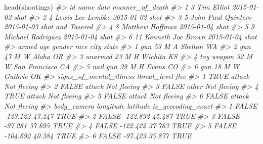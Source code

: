 \documentclass[
]{krantz}
\makeatletter
\newenvironment{Shaded}{\begin{snugshade}}{\end{snugshade}}
\newcommand{\CommentTok}[1]{\textcolor[rgb]{0.37,0.37,0.37}{\textit{#1}}}
\newcommand{\FunctionTok}[1]{\textcolor[rgb]{0,0,0}{#1}}
\newcommand{\NormalTok}[1]{#1}
\newenvironment{kframe}{%
\medskip{}
\setlength{\fboxsep}{.8em}
 \def\at@end@of@kframe{}%
 \ifinner\ifhmode%
  \def\at@end@of@kframe{\end{minipage}}%
  \begin{minipage}{\columnwidth}%
 \fi\fi%
 \def\FrameCommand##1{\hskip\@totalleftmargin \hskip-\fboxsep
 \colorbox{shadecolor}{##1}\hskip-\fboxsep
     \hskip-\linewidth \hskip-\@totalleftmargin \hskip\columnwidth}%
 \MakeFramed {\advance\hsize-\width
   \@totalleftmargin\z@ \linewidth\hsize
   \@setminipage}}%
 {\par\unskip\endMakeFramed%
 \at@end@of@kframe}
\renewenvironment{Shaded}{\begin{kframe}}{\end{kframe}}
\makeatother
\begin{document}
\begin{Shaded}
\begin{Highlighting}[]
\FunctionTok{head}\NormalTok{(shootings)}
\CommentTok{\#\textgreater{}   id               name       date  manner\_of\_death}
\CommentTok{\#\textgreater{} 1  3         Tim Elliot 2015{-}01{-}02             shot}
\CommentTok{\#\textgreater{} 2  4   Lewis Lee Lembke 2015{-}01{-}02             shot}
\CommentTok{\#\textgreater{} 3  5 John Paul Quintero 2015{-}01{-}03 shot and Tasered}
\CommentTok{\#\textgreater{} 4  8    Matthew Hoffman 2015{-}01{-}04             shot}
\CommentTok{\#\textgreater{} 5  9  Michael Rodriguez 2015{-}01{-}04             shot}
\CommentTok{\#\textgreater{} 6 11  Kenneth Joe Brown 2015{-}01{-}04             shot}
\CommentTok{\#\textgreater{}        armed age gender race          city state}
\CommentTok{\#\textgreater{} 1        gun  53      M    A       Shelton    WA}
\CommentTok{\#\textgreater{} 2        gun  47      M    W         Aloha    OR}
\CommentTok{\#\textgreater{} 3    unarmed  23      M    H       Wichita    KS}
\CommentTok{\#\textgreater{} 4 toy weapon  32      M    W San Francisco    CA}
\CommentTok{\#\textgreater{} 5   nail gun  39      M    H         Evans    CO}
\CommentTok{\#\textgreater{} 6        gun  18      M    W       Guthrie    OK}
\CommentTok{\#\textgreater{}   signs\_of\_mental\_illness threat\_level        flee}
\CommentTok{\#\textgreater{} 1                    TRUE       attack Not fleeing}
\CommentTok{\#\textgreater{} 2                   FALSE       attack Not fleeing}
\CommentTok{\#\textgreater{} 3                   FALSE        other Not fleeing}
\CommentTok{\#\textgreater{} 4                    TRUE       attack Not fleeing}
\CommentTok{\#\textgreater{} 5                   FALSE       attack Not fleeing}
\CommentTok{\#\textgreater{} 6                   FALSE       attack Not fleeing}
\CommentTok{\#\textgreater{}   body\_camera longitude latitude is\_geocoding\_exact}
\CommentTok{\#\textgreater{} 1       FALSE  {-}123.122   47.247               TRUE}
\CommentTok{\#\textgreater{} 2       FALSE  {-}122.892   45.487               TRUE}
\CommentTok{\#\textgreater{} 3       FALSE   {-}97.281   37.695               TRUE}
\CommentTok{\#\textgreater{} 4       FALSE  {-}122.422   37.763               TRUE}
\CommentTok{\#\textgreater{} 5       FALSE  {-}104.692   40.384               TRUE}
\CommentTok{\#\textgreater{} 6       FALSE   {-}97.423   35.877               TRUE}
\end{Highlighting}
\end{Shaded}
\end{document}
